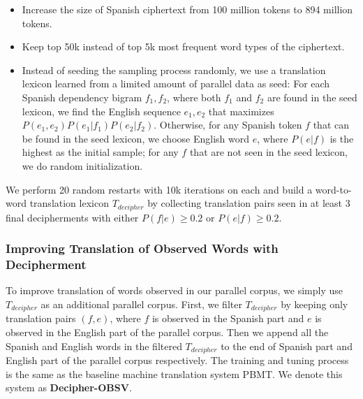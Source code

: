 \begin{itemize}
\item Increase the size of Spanish ciphertext from 100 million tokens to 894 million tokens.
\item Keep top 50k instead of top 5k most frequent word types of the ciphertext.
\item Instead of seeding the sampling process randomly, we use a translation lexicon learned from a limited amount of parallel data as seed: For each Spanish dependency bigram $f_{1},f_{2}$, where both $f_{1}$ and $f_{2}$ are found in the seed lexicon, we find the English sequence $e_{1},e_{2}$ that maximizes $P(e_{1},e_{2})P(e_{1}|f_{1})P(e_{2}|f_{2})$. Otherwise, for any Spanish token $f$ that can be found in the seed lexicon, we choose English word $e$, where $P(e|f)$ is the highest as the initial sample; for any $f$ that are not seen in the seed lexicon, we do random initialization.
\end{itemize}

We perform 20 random restarts with 10k iterations on each and build a word-to-word translation lexicon $T_{decipher}$ by collecting translation pairs seen in at least 3 final decipherments with either $P(f|e)\geq 0.2$ or $P(e|f)\geq 0.2$.


\subsubsection{Improving Translation of Observed Words with Decipherment}
\label{d_obsv}
To improve translation of words observed in our parallel corpus, we simply  use $T_{decipher}$ as an additional parallel corpus. First, we filter $T_{decipher}$ by keeping only translation pairs $(f,e)$, where $f$ is observed in the Spanish part and $e$ is observed in the English part of the parallel corpus. Then we append all the Spanish and English words in the filtered $T_{decipher}$ to the end of Spanish part and English part of the parallel corpus respectively. The training and tuning process is the same as the baseline machine translation system PBMT. We denote this system as \textbf{Decipher-OBSV}.



